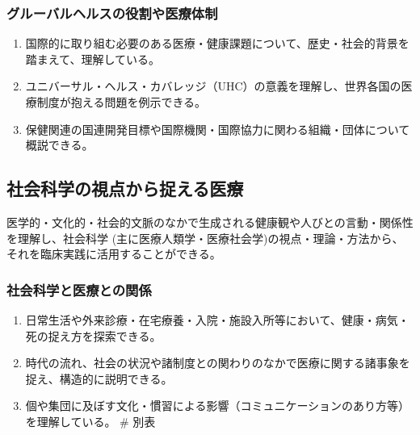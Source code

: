 \documentclass[
]{ltjsarticle}
\providecommand{\tightlist}{%
  \setlength{\itemsep}{0pt}\setlength{\parskip}{0pt}}
\begin{document}
\hypertarget{ux30b0ux30ebux30fcux30d0ux30ebux30d8ux30ebux30b9ux306eux5f79ux5272ux3084ux533bux7642ux4f53ux5236}{%
\subsubsection{グルーバルヘルスの役割や医療体制}\label{ux30b0ux30ebux30fcux30d0ux30ebux30d8ux30ebux30b9ux306eux5f79ux5272ux3084ux533bux7642ux4f53ux5236}}

\begin{enumerate}
\def\labelenumi{\arabic{enumi}.}
\tightlist
\item
  国際的に取り組む必要のある医療・健康課題について、歴史・社会的背景を踏まえて、理解している。
\item
  ユニバーサル・ヘルス・カバレッジ（UHC）の意義を理解し、世界各国の医療制度が抱える問題を例示できる。
\item
  保健関連の国連開発目標や国際機関・国際協力に関わる組織・団体について概説できる。
\end{enumerate}

\hypertarget{ux793eux4f1aux79d1ux5b66ux306eux8996ux70b9ux304bux3089ux6349ux3048ux308bux533bux7642}{%
\subsection{社会科学の視点から捉える医療}\label{ux793eux4f1aux79d1ux5b66ux306eux8996ux70b9ux304bux3089ux6349ux3048ux308bux533bux7642}}

医学的・文化的・社会的文脈のなかで生成される健康観や人びとの言動・関係性を理解し、社会科学
(主に医療人類学・医療社会学)の視点・理論・方法から、それを臨床実践に活用することができる。

\hypertarget{ux793eux4f1aux79d1ux5b66ux3068ux533bux7642ux3068ux306eux95a2ux4fc2}{%
\subsubsection{社会科学と医療との関係}\label{ux793eux4f1aux79d1ux5b66ux3068ux533bux7642ux3068ux306eux95a2ux4fc2}}

\begin{enumerate}
\def\labelenumi{\arabic{enumi}.}
\tightlist
\item
  日常生活や外来診療・在宅療養・入院・施設入所等において、健康・病気・死の捉え方を探索できる。
\item
  時代の流れ、社会の状況や諸制度との関わりのなかで医療に関する諸事象を捉え、構造的に説明できる。
\item
  個や集団に及ぼす文化・慣習による影響（コミュニケーションのあり方等）を理解している。
  \newpage \# 別表
\end{enumerate}
\end{document}
